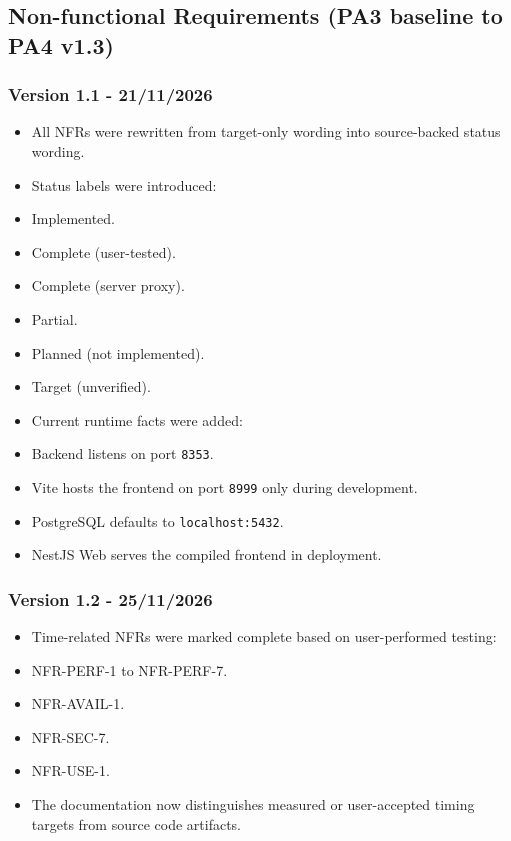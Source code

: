 \documentclass[12pt]{article}
\begin{document}
\hypertarget{sec:non-functional-requirements-pa3-baseline-to-pa4-v1-3}{}
\subsection*{Non-functional Requirements (PA3 baseline to PA4 v1.3)}
\par\medskip

\hypertarget{sec:version-1-1-21-11-2026}{}
\subsubsection*{Version 1.1 - 21/11/2026}
\par\medskip

\begin{itemize}
\item All NFRs were rewritten from target-only wording into source-backed status wording.
\item Status labels were introduced:
\item Implemented.
\item Complete (user-tested).
\item Complete (server proxy).
\item Partial.
\item Planned (not implemented).
\item Target (unverified).
\item Current runtime facts were added:
\item Backend listens on port \texttt{8353}.
\item Vite hosts the frontend on port \texttt{8999} only during development.
\item PostgreSQL defaults to \texttt{localhost:5432}.
\item NestJS Web serves the compiled frontend in deployment.
\end{itemize}
\par\medskip

\hypertarget{sec:version-1-2-25-11-2026}{}
\subsubsection*{Version 1.2 - 25/11/2026}
\par\medskip

\begin{itemize}
\item Time-related NFRs were marked complete based on user-performed testing:
\item NFR-PERF-1 to NFR-PERF-7.
\item NFR-AVAIL-1.
\item NFR-SEC-7.
\item NFR-USE-1.
\item The documentation now distinguishes measured or user-accepted timing targets from source code artifacts.
\end{itemize}
\par\medskip
\end{document}
